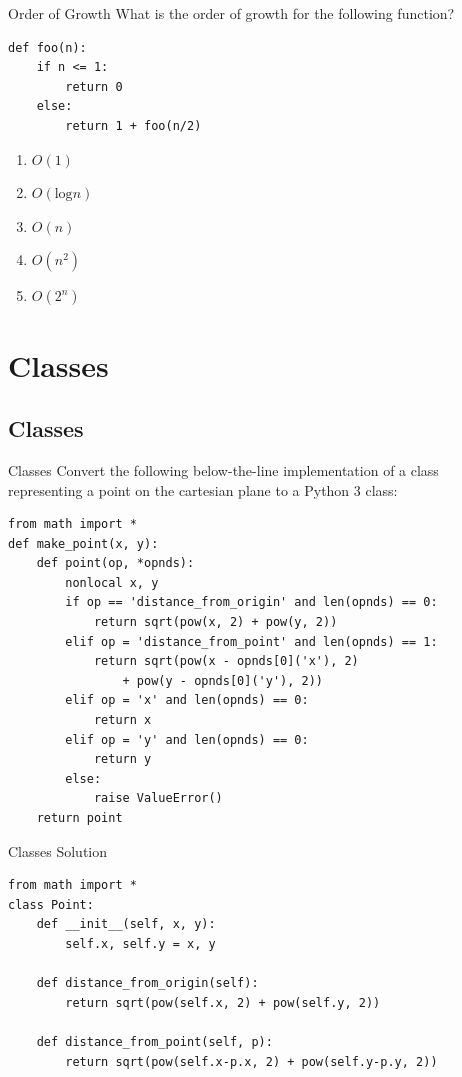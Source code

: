 \documentclass[9pt]{beamer}
\begin{document}
\begin{frame}[fragile]{Order of Growth}
  What is the order of growth for the following function?

  \begin{lstlisting}
def foo(n):
    if n <= 1:
        return 0
    else:
        return 1 + foo(n/2)
  \end{lstlisting}

  \begin{enumerate}
    \item
      $O(1)$
    \item
      \alert<2>{$O(\text{log}n)$}
    \item
      $O(n)$
    \item
      $O(n^2)$
    \item
      $O(2^n)$
  \end{enumerate}
\end{frame}

\section{Classes}
\subsection{Classes}

\begin{frame}[fragile]{Classes}
  Convert the following below-the-line implementation of a class
  representing a point on the cartesian plane to a Python 3 class:

  \begin{lstlisting}[basicstyle=\small]
from math import *
def make_point(x, y):
    def point(op, *opnds):
        nonlocal x, y
        if op == 'distance_from_origin' and len(opnds) == 0:
            return sqrt(pow(x, 2) + pow(y, 2))
        elif op = 'distance_from_point' and len(opnds) == 1:
            return sqrt(pow(x - opnds[0]('x'), 2)
                + pow(y - opnds[0]('y'), 2))
        elif op = 'x' and len(opnds) == 0:
            return x
        elif op = 'y' and len(opnds) == 0:
            return y
        else:
            raise ValueError()
    return point
  \end{lstlisting}
\end{frame}

\begin{frame}[fragile]{Classes}
  Solution

  \begin{lstlisting}[basicstyle=\small]
from math import *
class Point:
    def __init__(self, x, y):
        self.x, self.y = x, y

    def distance_from_origin(self):
        return sqrt(pow(self.x, 2) + pow(self.y, 2))

    def distance_from_point(self, p):
        return sqrt(pow(self.x-p.x, 2) + pow(self.y-p.y, 2))
  \end{lstlisting}
\end{frame}
\end{document}
